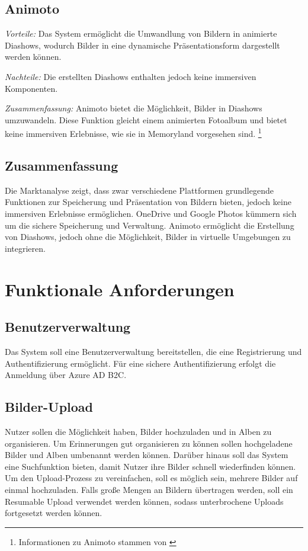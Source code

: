 \subsection{Animoto}

\emph{Vorteile:}
Das System ermöglicht die Umwandlung von Bildern in animierte Diashows,
wodurch Bilder in eine dynamische Präsentationsform dargestellt werden
können.

\emph{Nachteile:}
Die erstellten Diashows enthalten jedoch keine immersiven Komponenten.

\emph{Zusammenfassung:}
Animoto bietet die Möglichkeit, Bilder in Diashows umzuwandeln. Diese Funktion gleicht 
einem animierten Fotoalbum und bietet keine immersiven Erlebnisse, wie sie in Memoryland
vorgesehen sind. \footnote{Informationen zu Animoto stammen von \cite{Animoto}}

\subsection{Zusammenfassung}

Die Marktanalyse zeigt, dass zwar verschiedene Plattformen grundlegende 
Funktionen zur Speicherung und Präsentation von Bildern bieten, jedoch 
keine immersiven Erlebnisse ermöglichen. OneDrive und Google Photos kümmern 
sich um die sichere Speicherung und Verwaltung. Animoto ermöglicht die 
Erstellung von Diashows, jedoch ohne die Möglichkeit, Bilder in virtuelle 
Umgebungen zu integrieren.

\section{Funktionale Anforderungen}

\subsection{Benutzerverwaltung}

Das System soll eine Benutzerverwaltung bereitstellen, die eine Registrierung 
und Authentifizierung ermöglicht. Für eine sichere Authentifizierung erfolgt
die Anmeldung über Azure AD B2C.

\subsection{Bilder-Upload}

Nutzer sollen die Möglichkeit haben, Bilder hochzuladen und in Alben zu organisieren. 
Um Erinnerungen gut organisieren zu können sollen hochgeladene Bilder und Alben 
umbenannt werden können. Darüber hinaus soll das System eine Suchfunktion bieten, 
damit Nutzer ihre Bilder schnell wiederfinden können. Um den Upload-Prozess zu 
vereinfachen, soll es möglich sein, mehrere Bilder auf einmal hochzuladen. Falls 
gro\ss{}e Mengen an Bildern übertragen werden, soll ein Resumable Upload verwendet werden
können, sodass unterbrochene Uploads fortgesetzt werden können.

